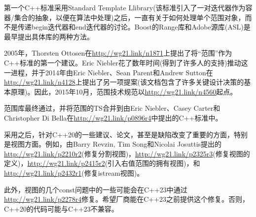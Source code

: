 第一个C++标准采用Standard Template Llibrary(该标准引入了一对迭代器作为容器/集合的抽象，以便在算法中处理)之后，一直有关于如何处理单个范围对象，而不是传递begin迭代器和end迭代器的讨论。Boost的Range库和Adobe源库(ASL)是最早提出具体库的两种方法。

2005年，Thorsten Ottosen在\url{http://wg21.link/n1871}上提出了将“范围”作为C++标准的第一个建议。Eric Niebler花了数年时间(得到了许多人的支持)推动这一进程，并于2014年由Eric Niebler、Sean Parent和Andrew Sutton在\url{http://wg21.link/n4128}上提出了另一项提案(该文档包含了许多关键设计决策的基本原理)。因此，2015年10月，范围技术规范以\url{http://wg21.link/n4560}起点。

范围库最终通过，并将范围的TS合并到由Eric Niebler、Casey Carter和Christopher Di Bella在\url{http://wg21.link/p0896r4}中提出的C++标准中。

采用之后，针对C++20的一些建议、论文，甚至是缺陷改变了重要的方面，特别是视图方面。例如，由Barry Revzin, Tim Song和Nicolai Josuttis提出的\url{http://wg21.link/p2210r2}(修复分割视图)，\url{http://wg21.link/p2325r3}(修复视图的定义)，\url{http://wg21.link/p2415r2}(引入右值范围的拥有视图)，和\url{http://wg21.link/p2432r1}(修复istream视图)。

此外，视图的几个const问题中的一些可能会在C++23中通过\url{http://wg21.link/p2278r4}修复。希望厂商能在C++23之前提供这个修复。否则，C++20的代码可能与C++23不兼容。